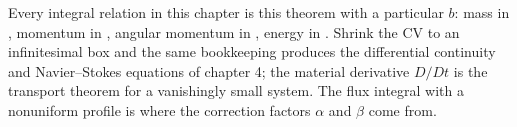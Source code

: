 \begin{hides}
Every integral relation in this chapter is this theorem with a particular $b$: mass in , momentum in , angular momentum in , energy in . Shrink the CV to an infinitesimal box and the same bookkeeping produces the differential continuity and Navier--Stokes equations of chapter 4; the material derivative $D/Dt$ is the transport theorem for a vanishingly small system. The flux integral with a nonuniform profile is where the correction factors $\alpha$ and $\beta$ come from.
\end{hides}
